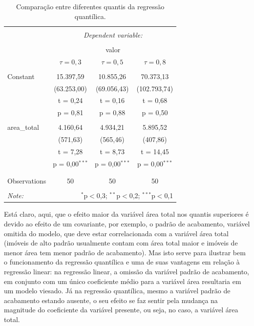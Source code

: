 \documentclass[a4paper, 12pt]{article}
\begin{document}
\begin{table}[!htbp] \centering 
  \caption{Comparação entre diferentes quantis da regressão quantílica.} 
  \label{tab:fits} 
\begin{tabular}{@{\extracolsep{5pt}}lccc} 
\\[-1.8ex]\hline 
\hline \\[-1.8ex] 
 & \multicolumn{3}{c}{\textit{Dependent variable:}} \\ 
\cline{2-4} 
\\[-1.8ex] & \multicolumn{3}{c}{valor} \\ 
 & $\tau=0,3$ & $\tau=0,5$ & $\tau=0,8$ \\ 
\hline \\[-1.8ex] 
 Constant & 15.397,59 & 10.855,26 & 70.373,13 \\ 
  & (63.253,00) & (69.056,43) & (102.793,74) \\ 
  & t = 0,24 & t = 0,16 & t = 0,68 \\ 
  & p = 0,81 & p = 0,88 & p = 0,50 \\ 
  & & & \\ 
 area\_total & 4.160,64 & 4.934,21 & 5.895,52 \\ 
  & (571,63) & (565,46) & (407,86) \\ 
  & t = 7,28 & t = 8,73 & t = 14,45 \\ 
  & p = 0,00$^{***}$ & p = 0,00$^{***}$ & p = 0,00$^{***}$ \\ 
  & & & \\ 
\hline \\[-1.8ex] 
Observations & 50 & 50 & 50 \\ 
\hline 
\hline \\[-1.8ex] 
\textit{Note:}  & \multicolumn{3}{r}{$^{*}$p$<$0,3; $^{**}$p$<$0,2; $^{***}$p$<$0,1} \\ 
\end{tabular} 
\end{table}

Está claro, aqui, que o efeito maior da variável área total nos quantis
superiores é devido ao efeito de um covariante, por exemplo, o padrão de
acabamento, variável omitida do modelo, que deve estar correlacionada
com a variável área total (imóveis de alto padrão usualmente contam com
área total maior e imóveis de menor área tem menor padrão de
acabamento). Mas isto serve para ilustrar bem o funcionamento da
regressão quantílica e uma de suas vantagens em relação à regressão
linear: na regressão linear, a omissão da variável padrão de acabamento,
em conjunto com um único coeficiente médio para a variável área
resultaria em um modelo viesado. Já na regressão quantílica, mesmo a
variável padrão de acabamento estando ausente, o seu efeito se faz
sentir pela mudança na magnitude do coeficiente da variável presente, ou
seja, no caso, a variável área total.
\end{document}
